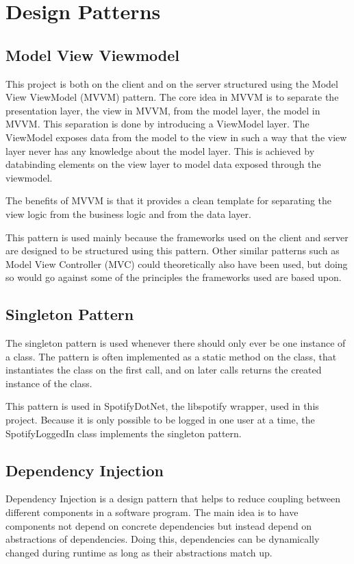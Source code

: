 \chapter{Design Patterns}

\section{Model View Viewmodel}

This project is both on the client and on the server structured using
the Model View ViewModel (MVVM) pattern. The core idea in MVVM is to
separate the presentation layer, the view in MVVM, from the model
layer, the model in MVVM. This separation is done by introducing a
ViewModel layer. The ViewModel exposes data from the model to the view
in such a way that the view layer never has any knowledge about the
model layer. This is achieved by databinding elements on the view
layer to model data exposed through the viewmodel.

The benefits of MVVM is that it provides a clean template for
separating the view logic from the business logic and from the data
layer.

This pattern is used mainly because the frameworks used on the client
and server are designed to be structured using this pattern. Other
similar patterns such as Model View Controller (MVC) could
theoretically also have been used, but doing so would go against some
of the principles the frameworks used are based upon.

\section{Singleton Pattern}

The singleton pattern is used whenever there should only ever be one
instance of a class. The pattern is often implemented as a static
method on the class, that instantiates the class on the first call,
and on later calls returns the created instance of the class.

This pattern is used in SpotifyDotNet, the libspotify wrapper, used in
this project. Because it is only possible to be logged in one user at
a time, the SpotifyLoggedIn class implements the singleton pattern.

\section{Dependency Injection}

Dependency Injection is a design pattern that helps to reduce coupling
between different components in a software program. The main idea is
to have components not depend on concrete dependencies but instead
depend on abstractions of dependencies. Doing this, dependencies can
be dynamically changed during runtime as long as their abstractions
match up.

